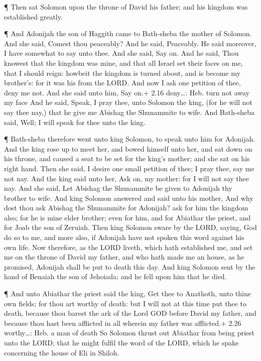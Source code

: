  ¶ Then sat Solomon upon the throne of David his father;
and his kingdom was established greatly.

 ¶ And Adonijah the son of Haggith came to Bath-sheba the
mother of Solomon. And she said, Comest thou peaceably? And he said,
Peaceably.  He said moreover, I have somewhat to say unto
thee. And she said, Say on.  And he said, Thou knowest that
the kingdom was mine, and that all Israel set their faces on me, that I
should reign: howbeit the kingdom is turned about, and is become my
brother's: for it was his from the LORD.  And now I ask one
petition of thee, deny me not. And she said unto him, Say on.+ 2.16
deny\ldots: Heb. turn not away my face  And he said, Speak,
I pray thee, unto Solomon the king, (for he will not say thee nay,) that
he give me Abishag the Shunammite to wife.  And Bath-sheba
said, Well; I will speak for thee unto the king.

 ¶ Bath-sheba therefore went unto king Solomon, to speak
unto him for Adonijah. And the king rose up to meet her, and bowed
himself unto her, and sat down on his throne, and caused a seat to be
set for the king's mother; and she sat on his right hand. 
Then she said, I desire one small petition of thee; I pray thee, say me
not nay. And the king said unto her, Ask on, my mother: for I will not
say thee nay.  And she said, Let Abishag the Shunammite be
given to Adonijah thy brother to wife.  And king Solomon
answered and said unto his mother, And why dost thou ask Abishag the
Shunammite for Adonijah? ask for him the kingdom also; for he is mine
elder brother; even for him, and for Abiathar the priest, and for Joab
the son of Zeruiah.  Then king Solomon sware by the LORD,
saying, God do so to me, and more also, if Adonijah have not spoken this
word against his own life.  Now therefore, as the LORD
liveth, which hath established me, and set me on the throne of David my
father, and who hath made me an house, as he promised, Adonijah shall be
put to death this day.  And king Solomon sent by the hand
of Benaiah the son of Jehoiada; and he fell upon him that he died.

 ¶ And unto Abiathar the priest said the king, Get thee to
Anathoth, unto thine own fields; for thou art worthy of death: but I
will not at this time put thee to death, because thou barest the ark of
the Lord GOD before David my father, and because thou hast been
afflicted in all wherein my father was afflicted.+ 2.26 worthy\ldots:
Heb. a man of death  So Solomon thrust out Abiathar from
being priest unto the LORD; that he might fulfil the word of the LORD,
which he spake concerning the house of Eli in Shiloh.

